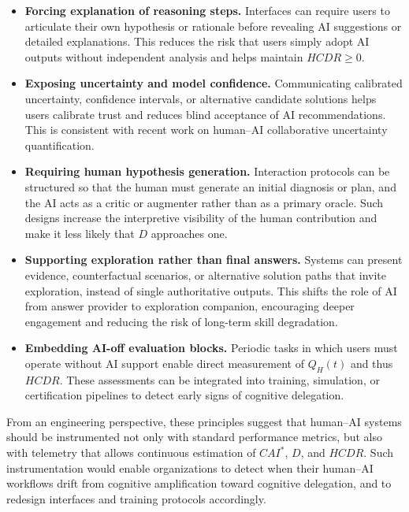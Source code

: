 \documentclass[11pt]{article}
\begin{document}
\begin{itemize}
\item \textbf{Forcing explanation of reasoning steps.}
      Interfaces can require users to articulate their own
      hypothesis or rationale before revealing AI suggestions
      or detailed explanations.
      This reduces the risk that users simply adopt AI outputs
      without independent analysis and helps maintain
      $HCDR \ge 0$.\cite{cognitive-offloading,ai-pitfalls}
\item \textbf{Exposing uncertainty and model confidence.}
      Communicating calibrated uncertainty, confidence intervals,
      or alternative candidate solutions helps users calibrate
      trust and reduces blind acceptance of AI recommendations.
      This is consistent with recent work on human--AI
      collaborative uncertainty quantification.\cite{human-ai-uq,uncertainty-explainability}
\item \textbf{Requiring human hypothesis generation.}
      Interaction protocols can be structured so that the human
      must generate an initial diagnosis or plan, and the AI
      acts as a critic or augmenter rather than as a primary
      oracle.
      Such designs increase the interpretive visibility of the
      human contribution and make it less likely that
      $D$ approaches one.\cite{designing-ai-expertise,designing-intelligent-organization}
\item \textbf{Supporting exploration rather than final answers.}
      Systems can present evidence, counterfactual scenarios,
      or alternative solution paths that invite exploration,
      instead of single authoritative outputs.
      This shifts the role of AI from answer provider to
      exploration companion, encouraging deeper engagement and
      reducing the risk of long-term skill degradation.\cite{designing-ai-expertise,ai-cognitive-implications}
\item \textbf{Embedding AI-off evaluation blocks.}
      Periodic tasks in which users must operate without AI
      support enable direct measurement of $Q_H(t)$ and thus
      $HCDR$.
      These assessments can be integrated into training,
      simulation, or certification pipelines to detect early
      signs of cognitive delegation.\cite{impact-ai-cognition,cognitive-offloading}
\end{itemize}

From an engineering perspective, these principles suggest that
human--AI systems should be instrumented not only with standard
performance metrics, but also with telemetry that allows continuous
estimation of $CAI^*$, $D$, and $HCDR$.
Such instrumentation would enable organizations to detect when
their human--AI workflows drift from cognitive amplification
toward cognitive delegation, and to redesign interfaces and
training protocols accordingly.\cite{designing-intelligent-organization,automation-bias-ai-act}
\end{document}
